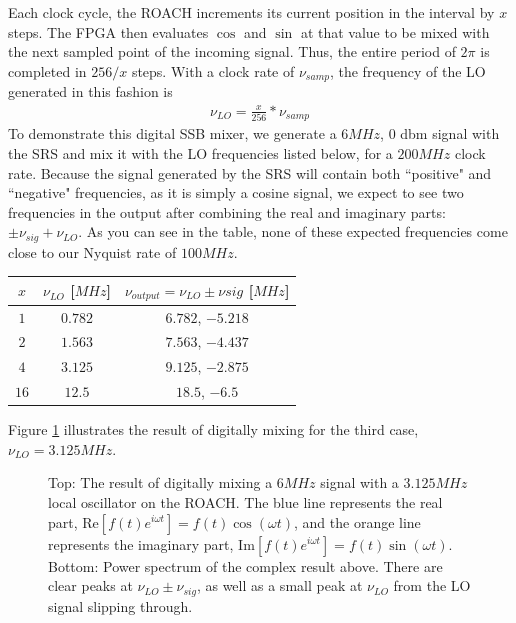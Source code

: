\documentclass[12pt]{article}
\begin{document}
Each clock cycle, the ROACH increments its current position in the interval by $x$ steps. The FPGA then evaluates $\cos$ and $\sin$ at that value to be mixed with the next sampled point of the incoming signal. Thus, the entire period of $2\pi$ is completed in $256/x$ steps. With a clock rate of $\nu_{samp}$, the frequency of the LO generated in this fashion is
\begin{eqnarray}
\nu_{LO} = \frac{x}{256} * \nu_{samp}
\end{eqnarray}
To demonstrate this digital SSB mixer, we generate a $6MHz$, $0$ dbm signal with the SRS and mix it with the LO frequencies listed below, for a $200 MHz$ clock rate. Because the signal generated by the SRS will contain both ``positive" and ``negative" frequencies, as it is simply a cosine signal, we expect to see two frequencies in the output after combining the real and imaginary parts: $\pm \nu_{sig} + \nu_{LO}$. As you can see in the table, none of these expected frequencies come close to our Nyquist rate of $100 MHz$.
\begin{center}
  \begin{tabular}{ c | c | c }
    $x$ & $\nu_{LO}$ [$MHz$] & $\nu_{output} = \nu_{LO} \pm \nu{sig}$ [$MHz$]\\ \hline
    $1$ & $0.782 $ & $6.782$, $-5.218 $ \\
    $2$ & $1.563 $ & $7.563$, $-4.437$\\
    $4$ & $3.125 $ & $9.125$, $-2.875$ \\
    $16$ & $12.5 $ & $18.5$, $-6.5$\\
  \end{tabular}
\end{center}

Figure \ref{fig:ssb} illustrates the result of digitally mixing for the third case, $\nu_{LO} = 3.125 MHz$. 

\begin{figure}[H]
\caption[SODUMB]{Top: The result of digitally mixing a $6 MHz$ signal with a $3.125 MHz$ local oscillator on the ROACH. The blue line represents the real part, Re${[f(t)e^{i\omega t}]} = f(t) \cos(\omega t)$, and the orange line represents the imaginary part, Im${[f(t)e^{i\omega t}]} = f(t) \sin(\omega t)$. Bottom: Power spectrum of the complex result above. There are clear peaks at $\nu_{LO} \pm \nu_{sig}$, as well as a small peak at $\nu_{LO}$ from the LO signal slipping through.}
\label{fig:ssb}
\end{figure}
\end{document}
